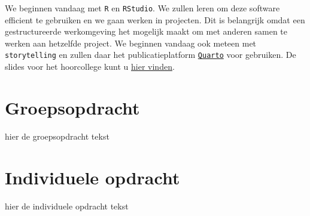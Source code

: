 \documentclass[
  letterpaper,
  DIV=11,
  numbers=noendperiod]{scrreprt}
\begin{document}
\begin{tcolorbox}[enhanced jigsaw, arc=.35mm, bottomrule=.15mm, bottomtitle=1mm, breakable, colback=white, colbacktitle=quarto-callout-tip-color!10!white, colframe=quarto-callout-tip-color-frame, coltitle=black, left=2mm, leftrule=.75mm, opacityback=0, opacitybacktitle=0.6, rightrule=.15mm, title=\textcolor{quarto-callout-tip-color}{\faLightbulb}\hspace{0.5em}{Hoorcollege 26 juni 2026}, titlerule=0mm, toprule=.15mm, toptitle=1mm]

We beginnen vandaag met \texttt{R} en \texttt{RStudio}. We zullen leren
om deze software efficient te gebruiken en we gaan werken in projecten.
Dit is belangrijk omdat een gestructureerde werkomgeving het mogelijk
maakt om met anderen samen te werken aan hetzelfde project. We beginnen
vandaag ook meteen met \texttt{storytelling} en zullen daar het
publicatieplatform \href{}{\texttt{Quarto}} voor gebruiken. De slides
voor het hoorcollege kunt u \href{slides/lec-1.html}{hier vinden}.

\end{tcolorbox}

\section{Groepsopdracht}\label{groepsopdracht-7}

hier de groepsopdracht tekst

\section{Individuele opdracht}\label{individuele-opdracht-6}

hier de individuele opdracht tekst
\end{document}
